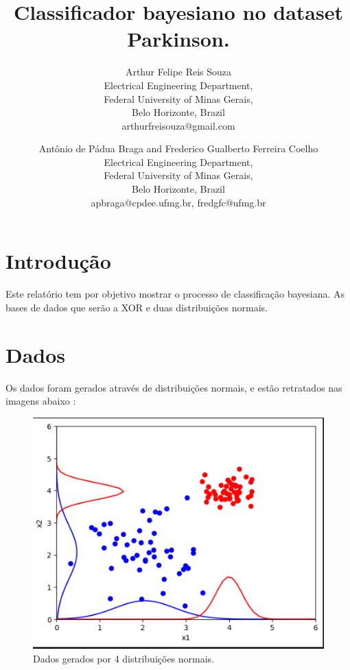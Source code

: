 \documentclass{article}
\begin{document}
\title{Classificador bayesiano no dataset Parkinson.}

\author{Arthur Felipe Reis Souza \\
Electrical Engineering Department, \\
Federal University of Minas Gerais, \\
Belo Horizonte, Brazil \\
arthurfreisouza@gmail.com \\
\and
Antônio de Pádua Braga and Frederico Gualberto Ferreira Coelho \\
Electrical Engineering Department, \\
Federal University of Minas Gerais, \\
Belo Horizonte, Brazil \\
apbraga@cpdee.ufmg.br, fredgfc@ufmg.br
}

\maketitle

\begin{abstract}
\end{abstract}

\section{Introdução}

Este relatório tem por objetivo mostrar o processo de classificação bayesiana. As bases de dados que serão a XOR e duas distribuições normais.

\section{Dados}

Os dados foram gerados através de distribuições normais, e estão retratados nas imagens abaixo : 

\begin{figure}[h]
    \centering
    \includegraphics[width=0.75\linewidth]{normal_dit.png}
    \caption{Dados gerados por 4 distribuições normais.}
    \label{fig:kernel_types}
 \end{figure}
\end{document}
